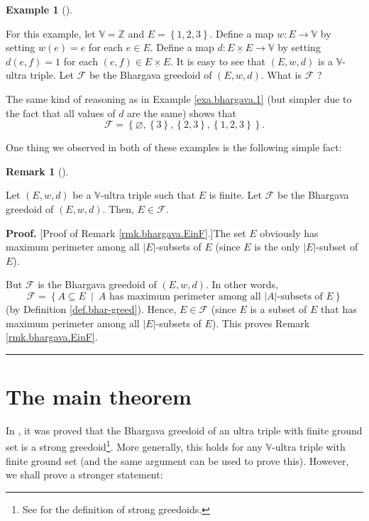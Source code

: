 \documentclass[numbers=enddot,12pt,final,onecolumn,notitlepage]{scrartcl}%
\theoremstyle{definition}
\newtheorem{remk}[theo]{Remark}
\newenvironment{remark}[1][]
{\begin{remk}[#1]\begin{leftbar}}
{\end{leftbar}\end{remk}}
\newtheorem{exam}[theo]{Example}
\newenvironment{example}[1][]
{\begin{exam}[#1]\begin{leftbar}}
{\end{leftbar}\end{exam}}
\newenvironment{proof}[1][Proof]{\noindent\textbf{#1.} }{\ \rule{0.5em}{0.5em}}
\newcommand{\timesu}{\mathbin{\underline{\times}}}
\theoremstyle{plainsl}
\begin{document}
\begin{example}
\label{exa.bhargava.0}For this example, let $\mathbb{V}=\mathbb{Z}$ and
$E=\left\{  1,2,3\right\}  $. Define a map $w:E\rightarrow\mathbb{V}$ by
setting $w\left(  e\right)  =e$ for each $e\in E$. Define a map $d:E\timesu
E\rightarrow\mathbb{V}$ by setting $d\left(  e,f\right)  =1$ for each $\left(
e,f\right)  \in E\timesu E$. It is easy to see that $\left(  E,w,d\right)  $
is a $\mathbb{V}$-ultra triple. Let $\mathcal{F}$ be the Bhargava greedoid of
$\left(  E,w,d\right)  $. What is $\mathcal{F}$ ?

The same kind of reasoning as in Example \ref{exa.bhargava.1} (but simpler due
to the fact that all values of $d$ are the same) shows that%
\[
\mathcal{F}=\left\{  \varnothing,\left\{  3\right\}  ,\left\{  2,3\right\}
,\left\{  1,2,3\right\}  \right\}  .
\]

\end{example}

One thing we observed in both of these examples is the following simple fact:

\begin{remark}
\label{rmk.bhargava.EinF}Let $\left(  E,w,d\right)  $ be a $\mathbb{V}$-ultra
triple such that $E$ is finite. Let $\mathcal{F}$ be the Bhargava greedoid of
$\left(  E,w,d\right)  $. Then, $E\in\mathcal{F}$.
\end{remark}

\begin{proof}
[Proof of Remark \ref{rmk.bhargava.EinF}.]The set $E$ obviously has maximum
perimeter among all $\left\vert E\right\vert $-subsets of $E$ (since $E$ is
the only $\left\vert E\right\vert $-subset of $E$).

But $\mathcal{F}$ is the Bhargava greedoid of $\left(  E,w,d\right)  $. In
other words,
\[
\mathcal{F}=\left\{  A\subseteq E\ \mid\ A\text{ has maximum perimeter among
all }\left\vert A\right\vert \text{-subsets of }E\right\}
\]
(by Definition \ref{def.bhar-greed}). Hence, $E\in\mathcal{F}$ (since $E$ is a
subset of $E$ that has maximum perimeter among all $\left\vert E\right\vert
$-subsets of $E$). This proves Remark \ref{rmk.bhargava.EinF}.
\end{proof}

\section{\label{sect.thm-bh-geg}The main theorem}

In \cite[Theorem 6.1]{GriPet19}, it was proved that the Bhargava greedoid of
an ultra triple with finite ground set is a strong greedoid\footnote{See
\cite[\S 6.1]{GriPet19} for the definition of strong greedoids.}. More
generally, this holds for any $\mathbb{V}$-ultra triple with finite ground set
(and the same argument can be used to prove this). However, we shall prove a
stronger statement:
\end{document}
